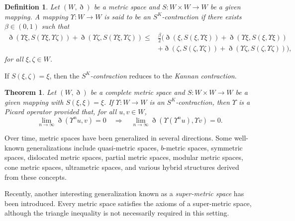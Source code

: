 \documentclass[pdflatex,sn-mathphys-num]{sn-jnl}%
\theoremstyle{thmstyleone}%
\newtheorem{theorem}{Theorem}%
\theoremstyle{thmstyletwo}%
\theoremstyle{thmstylethree}%
\newtheorem{definition}{Definition}%
\begin{document}
\begin{definition}\label{sk definition}\cite{bessem}
Let $(W,\eth)$ be a metric space and $S:W\times W \to W$ be a given mapping. 
A mapping $\Upsilon : W \to W$ is said to be an \textit{$S^K$-contraction} if there exists $\beta \in (0,1)$ such that
\begin{equation}\label{sk contraction}
\begin{split}
\eth(\Upsilon \xi,S(\Upsilon \xi,\Upsilon \zeta)) + \eth(\Upsilon \zeta,S(\Upsilon \xi,\Upsilon \zeta)) \le 
&\frac{\beta}{2} \Big(\eth(\xi,S(\xi,\Upsilon \xi )) + \eth(\Upsilon \xi,S(\xi,\Upsilon \xi )) \\
&+ \eth(\zeta ,S(\zeta,\Upsilon \zeta)) + \eth(\Upsilon \zeta,S(\zeta,\Upsilon \zeta))\Big),
\end{split}
\end{equation}
for all $\xi,\zeta \in W$.
\end{definition}

If $S(\xi,\zeta)=\xi$, then the \textit{$S^K$-contraction} reduces to the \textit{Kannan contraction}.

\begin{theorem}\cite{bessem}
Let $(W,\eth)$ be a complete metric space and $S:W\times W \to W$ be a given mapping with $S(\xi,\xi)=\xi$. 
If $\Upsilon  : W \to W$ is an \textit{$S^K$-contraction}, then $\Upsilon $ is a \textit{Picard operator} provided that, for all $u,v \in W$,
\[
\lim_{n \to \infty} \eth(\Upsilon^n u, v) = 0 
\quad \Longrightarrow \quad 
\lim_{n \to \infty} \eth(\Upsilon(\Upsilon^n u), \Upsilon  v) = 0.
\]
\end{theorem}


Over time, metric spaces have been generalized in several directions. 
Some well-known generalizations include quasi-metric spaces, $b$-metric spaces, symmetric spaces, dislocated metric spaces, partial metric spaces, modular metric spaces, cone metric spaces, ultrametric spaces, and various hybrid structures derived from these concepts.

Recently, another interesting generalization known as a \emph{super-metric space} has been introduced. 
Every metric space satisfies the axioms of a super-metric space, although the triangle inequality is not necessarily required in this setting.
\end{document}
